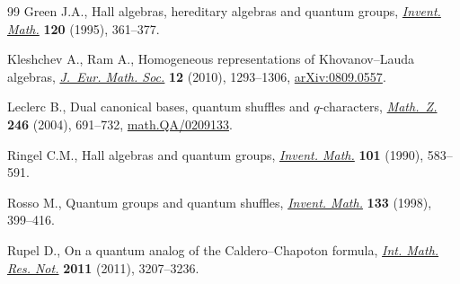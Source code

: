\documentclass[11pt]{article}
\numberwithin{equation}{section}
\begin{document}
\begin{thebibliography}{99}
Green J.A., Hall algebras, hereditary algebras and quantum groups,
  \href{http://dx.doi.org/10.1007/BF01241133}{\textit{Invent. Math.}} \textbf{120} (1995), 361--377.

Kleshchev A., Ram A., Homogeneous representations of {K}hovanov--{L}auda
  algebras, \href{http://dx.doi.org/10.4171/JEMS/230}{\textit{J.~Eur. Math. Soc.}} \textbf{12} (2010), 1293--1306,
  \href{http://arxiv.org/abs/0809.0557}{arXiv:0809.0557}.

Leclerc B., Dual canonical bases, quantum shuf\/f\/les and {$q$}-characters,
  \href{http://dx.doi.org/10.1007/s00209-003-0609-9}{\textit{Math.~Z.}} \textbf{246} (2004), 691--732, \href{http://arxiv.org/abs/math.QA/0209133}{math.QA/0209133}.

Ringel C.M., Hall algebras and quantum groups, \href{http://dx.doi.org/10.1007/BF01231516}{\textit{Invent. Math.}}
  \textbf{101} (1990), 583--591.

Rosso M., Quantum groups and quantum shuf\/f\/les,  \href{http://dx.doi.org/10.1007/s002220050249}{\textit{Invent. Math.}} \textbf{133}  (1998),  399--416.

Rupel D., On a quantum analog of the {C}aldero--{C}hapoton formula,
  \href{http://dx.doi.org/10.1093/imrn/rnq192}{\textit{Int. Math. Res. Not.}} \textbf{2011} (2011), 3207--3236.

\end{thebibliography}
\end{document}
